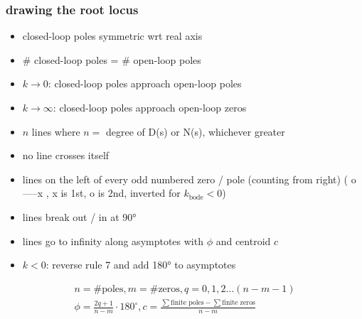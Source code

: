 \subsubsection*{drawing the root locus}
\begin{itemize}
    \item closed-loop poles symmetric wrt real axis
    \item \# closed-loop poles = \# open-loop poles
    \item $k \rightarrow 0$: closed-loop poles approach open-loop poles
    \item $k \rightarrow \infty$: closed-loop poles approach open-loop zeros
    \item $n$ lines where $n =$ degree of D(s) or N(s), whichever greater
    \item no line crosses itself
    \item lines on the left of every odd numbered zero / pole (counting from right) (    o-----x    , x is 1st, o is 2nd, inverted for $k_{\text{bode}} < 0$)
    \item lines break out / in at 90°
    \item lines go to infinity along asymptotes with $\phi$ and centroid $c$ 
    \item $k < 0$: reverse rule 7 and add 180° to asymptotes
\end{itemize}
\begin{align*}
    n = \# \text{poles}, m = \# \text{zeros}, q = 0, 1, 2 \dots (n-m-1)\\
    \phi = \frac{2q + 1}{n-m} \cdot 180^{\circ}, c = \frac{\sum\text{finite poles} - \sum\text{finite zeros}}{n - m}
\end{align*}